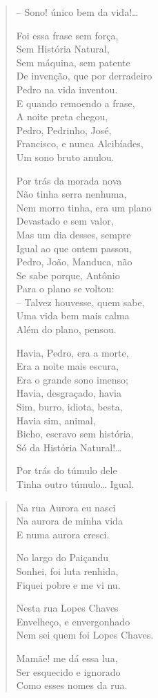 \begin{verse}
-- Sono! único bem da vida!\ldots{}

Foi essa frase sem força,\\
Sem História Natural,\\
Sem máquina, sem patente\\
De invenção, que por derradeiro\\
Pedro na vida inventou.\\
E quando remoendo a frase,\\
A noite preta chegou,\\
Pedro, Pedrinho, José,\\
Francisco, e nunca Alcibíades,\\
Um sono bruto anulou.

Por trás da morada nova\\
Não tinha serra nenhuma,\\
Nem morro tinha, era um plano\\
Devastado e sem valor,\\
Mas um dia desses, sempre\\
Igual ao que ontem passou,\\
Pedro, João, Manduca, não\\
Se sabe porque, Antônio\\
Para o plano se voltou:\\
-- Talvez houvesse, quem sabe,\\
Uma vida bem mais calma\\
Além do plano, pensou.

Havia, Pedro, era a morte,\\
Era a noite mais escura,\\
Era o grande sono imenso;\\
Havia, desgraçado, havia\\
Sim, burro, idiota, besta,\\
Havia sim, animal,\\
Bicho, escravo sem história,\\
Só da História Natural!\ldots{}

Por trás do túmulo dele\\
Tinha outro túmulo\ldots{} Igual.
\end{verse}

\pagebreak
{}

\begin{verse}
Na rua Aurora eu nasci\\
Na aurora de minha vida\\
E numa aurora cresci.

No largo do Paiçandu\\
Sonhei, foi luta renhida,\\
Fiquei pobre e me vi nu.

Nesta rua Lopes Chaves\\
Envelheço, e envergonhado\\
Nem sei quem foi Lopes Chaves.

Mamãe! me dá essa lua,\\
Ser esquecido e ignorado\\
Como esses nomes da rua.
\end{verse}

